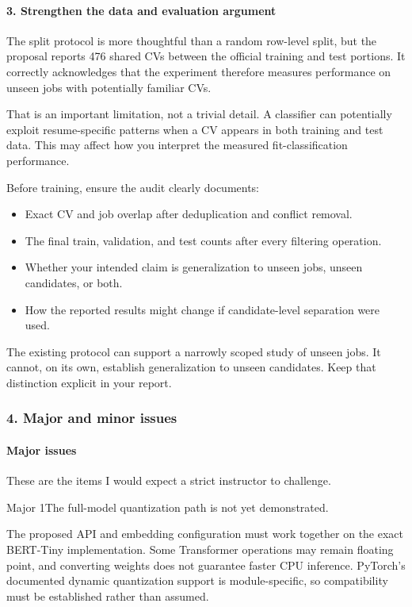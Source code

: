 \paragraph*{3. Strengthen the data and evaluation argument}
The split protocol is more thoughtful than a random row-level split, but the proposal reports 476 shared CVs between the official training and test portions. It correctly acknowledges that the experiment therefore measures performance on unseen jobs with potentially familiar CVs.

That is an important limitation, not a trivial detail. A classifier can potentially exploit resume-specific patterns when a CV appears in both training and test data. This may affect how you interpret the measured fit-classification performance.

Before training, ensure the audit clearly documents:

\begin{itemize}
\item Exact CV and job overlap after deduplication and conflict removal.
\item The final train, validation, and test counts after every filtering operation.
\item Whether your intended claim is generalization to unseen jobs, unseen candidates, or both.
\item How the reported results might change if candidate-level separation were used.
\end{itemize}
The existing protocol can support a narrowly scoped study of unseen jobs. It cannot, on its own, establish generalization to unseen candidates. Keep that distinction explicit in your report.

\subsubsection*{4. Major and minor issues}
\paragraph*{Major issues}
These are the items I would expect a strict instructor to challenge.

Major 1The full-model quantization path is not yet demonstrated.

The proposed API and embedding configuration must work together on the exact BERT-Tiny implementation. Some Transformer operations may remain floating point, and converting weights does not guarantee faster CPU inference. PyTorch's documented dynamic quantization support is module-specific, so compatibility must be established rather than assumed.

